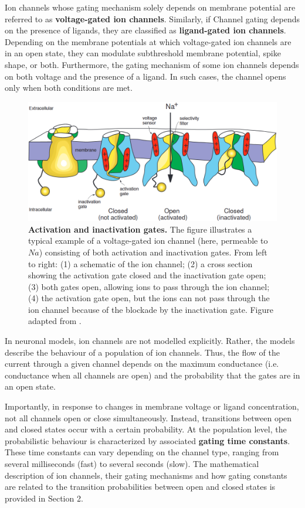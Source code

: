 \documentclass[../main.tex]{subfiles}
\begin{document}
Ion channels whose gating mechanism solely depends on membrane potential are referred to as \textbf{voltage-gated ion channels}. Similarly, if Channel gating depends on the presence of ligands, they are classified as \textbf{ligand-gated ion channels}. Depending on the membrane potentials at which voltage-gated ion channels are in an open state, they can modulate subthreshold membrane potential, spike shape, or both. Furthermore, the gating mechanism of some ion channels depends on both voltage and the presence of a ligand. In such cases, the channel opens only when both conditions are met.

\begin{figure}[!t]
    \centering
    \includegraphics[width=0.85\linewidth]{../img/sleep_and_r5_network/structure_of_v_gated_channels.png}
    \caption[Activation and inactivation gates]{
        \textbf{Activation and inactivation gates.}
        The figure illustrates a typical example of a voltage-gated ion channel (here, permeable to $Na$) consisting of both activation and inactivation gates. From left to right: (1) a schematic of the ion channel; (2) a cross section showing the activation gate closed and the inactivation gate open; (3) both gates open, allowing ions to pass through the ion channel; (4) the activation gate open, but the ions can not pass through the ion channel because of the blockade by the inactivation gate.
        Figure adapted from \parencite{izhikevichDynamicalSystemsNeuroscience2006}.
    }
    \label{fig:voltage_gated_channel_structure}
\end{figure}

In neuronal models, ion channels are not modelled explicitly. Rather, the models describe the behaviour of a population of ion channels. Thus, the flow of the current through a given channel depends on the maximum conductance (i.e. conductance when all channels are open) and the probability that the gates are in an open state.%

Importantly, in response to changes in membrane voltage or ligand concentration, not all channels open or close simultaneously. Instead, transitions between open and closed states occur with a certain probability. At the population level, the probabilistic behaviour is characterized by associated \textbf{gating time constants}. These time constants can vary depending on the channel type, ranging from several milliseconds (fast) to several seconds (slow). The mathematical description of ion channels, their gating mechanisms and how gating constants are related
to the transition probabilities between open and closed states is provided in Section 2.
\end{document}
